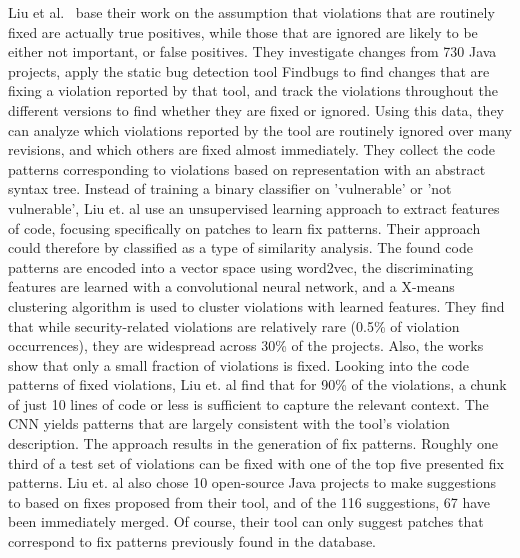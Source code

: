 \documentclass[
a4paper,
pagesize,
pdftex,
12pt,
twoside, %
BCOR=5mm, %
ngerman,
fleqn,
final,
]{scrartcl}
\begin{document}
	Liu et al.~\cite{Liu.2018} base their work on the assumption that violations that are routinely fixed are actually true positives, while those that are ignored are likely to be either not important, or false positives. They investigate changes from 730 Java projects, apply the static bug detection tool Findbugs to find changes that are fixing a violation reported by that tool, and track the violations throughout the different versions to find whether they are fixed or ignored. Using this data, they can analyze which violations reported by the tool are routinely ignored over many revisions, and which others are fixed almost immediately. They collect the code patterns corresponding to violations based on representation with an abstract syntax tree. Instead of training a binary classifier on 'vulnerable' or 'not vulnerable', Liu et. al use an unsupervised learning approach to extract features of code, focusing specifically on patches to learn fix patterns. Their approach could therefore by classified as a type of similarity analysis. The found code patterns are encoded into a vector space using word2vec, the discriminating features are learned with a convolutional neural network, and a X-means clustering algorithm is used to cluster violations with learned features. They find that while security-related violations are relatively rare (0.5\% of violation occurrences), they are widespread across 30\% of the projects. Also, the works show that only a small fraction of violations is fixed. Looking into the code patterns of fixed violations, Liu et. al find that for 90\% of the violations, a chunk of just 10 lines of code or less is sufficient to capture the relevant context. The CNN yields patterns that are largely consistent with the tool's violation description. The approach results in the generation of fix patterns. Roughly one third of a test set of violations can be fixed with one of the top five presented fix patterns. Liu et. al also chose 10 open-source Java projects to make suggestions to based on fixes proposed from their tool, and of the 116 suggestions, 67 have been immediately merged. Of course, their tool can only suggest patches that correspond to fix patterns previously found in the database. \\
\end{document}
